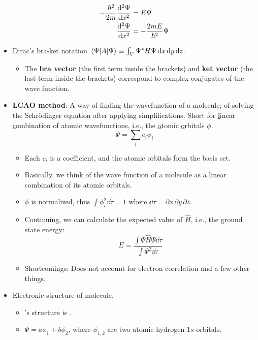 \documentclass[../notes.tex]{subfiles}
\begin{document}
\begin{itemize}
    \begin{align*}
        -\frac{\hbar^2}{2m}\dv[2]{\Psi}{x} &= E\Psi\\
        \dv[2]{\Psi}{x} &= -\frac{2mE}{\hbar^2}\Psi
    \end{align*}
    \item Dirac's bra-ket notation $\ev{A}{\Psi}\equiv\int_V\Psi^*\hat{H}\Psi\dd{x}\dd{y}\dd{z}$.
    \begin{itemize}
        \item The \textbf{bra vector} (the first term inside the brackets) and \textbf{ket vector} (the last term inside the brackets) correspond to complex conjugates of the wave function.
    \end{itemize}
    \item \textbf{LCAO method}: A way of finding the wavefunction of a molecule; of solving the Schr\"{o}dinger equation after applying simplifications. Short for \underline{l}inear \underline{c}ombination of atomic wavefunctions, i.e., the \underline{a}tomic \underline{o}rbitals $\phi$.
    \begin{equation*}
        \Psi = \sum_ic_i\phi_i
    \end{equation*}
    \begin{itemize}
        \item Each $c_i$ is a coefficient, and the atomic orbitals form the basis set.
        \item Basically, we think of the wave function of a molecule as a linear combination of its atomic orbitals.
        \item $\phi$ is normalized, thus $\int\phi_i^2\dd{\tau}=1$ where $\dd{\tau}=\partial x\, \partial y\, \partial z$.
        \item Continuing, we can calculate the expected value of $\hat{H}$, i.e., the ground state energy:
        \begin{equation*}
            E = \frac{\int\Psi\hat{H}\Psi\dd{\tau}}{\int\Psi^2\dd{\tau}}
        \end{equation*}
        \item Shortcomings: Does not account for electron correlation and a few other things.
    \end{itemize}
    \item Electronic structure of  molecule.
    \begin{itemize}
        \item {}'s structure is .
        \item $\Psi=a\phi_1+b\phi_2$, where $\phi_{1,2}$ are two atomic hydrogen $1s$ orbitals.

\end{itemize}
\end{itemize}
\end{document}
